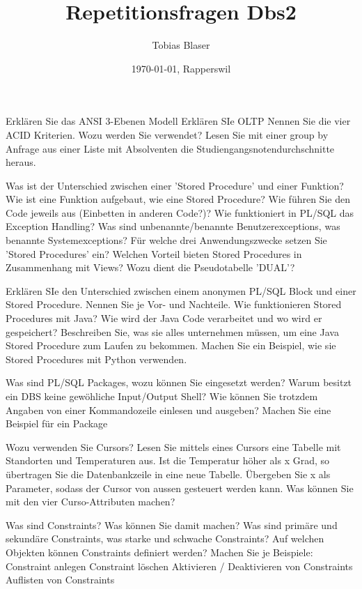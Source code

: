 \documentclass[ngerman,a4paper,12pt]{scrreprt}
\title{Repetitionsfragen Dbs2}
\author{Tobias Blaser}
\date{\today{}, Rapperswil}
\begin{document}
\tableofcontents
\clearpage


\ol
	\li Erklären Sie das ANSI 3-Ebenen Modell
	\li Erklären SIe OLTP
	\li Nennen Sie die vier ACID Kriterien. Wozu werden Sie verwendet?
	\li Lesen Sie mit einer group by Anfrage aus einer Liste mit Absolventen die Studiengangsnotendurchschnitte heraus.
\olS


\olR
	\li Was ist der Unterschied zwischen einer 'Stored Procedure' und einer Funktion?
	\li Wie ist eine Funktion aufgebaut, wie eine Stored Procedure? Wie führen Sie den Code jeweils aus (Einbetten in anderen Code?)?
	\li Wie funktioniert in PL/SQL das Exception Handling? Was sind unbenannte/benannte Benutzerexceptions, was benannte Systemexceptions?
	\li Für welche drei Anwendungszwecke setzen Sie 'Stored Procedures' ein?
	\li Welchen Vorteil bieten Stored Procedures in Zusammenhang mit Views?
	\li Wozu dient die Pseudotabelle 'DUAL'?
\olS


\olR
	\li Erklären SIe den Unterschied zwischen einem anonymen PL/SQL Block und einer Stored Procedure. Nennen Sie je Vor- und Nachteile.
	\li Wie funktionieren Stored Procedures mit Java?
	\li Wie wird der Java Code verarbeitet und wo wird er gespeichert?
	\li Beschreiben Sie, was sie alles unternehmen müssen, um eine Java Stored Procedure zum Laufen zu bekommen.
	\li Machen Sie ein Beispiel, wie sie Stored Procedures mit Python verwenden.
\olS


\olR
	\li Was sind PL/SQL Packages, wozu können Sie eingesetzt werden?
	\li Warum besitzt ein DBS keine gewöhliche Input/Output Shell? Wie können Sie trotzdem Angaben von einer Kommandozeile einlesen und ausgeben?
	\li Machen Sie eine Beispiel für ein Package
\olS


\olR
	\li Wozu verwenden Sie Cursors?
	\li Lesen Sie mittels eines Cursors eine Tabelle mit Standorten und Temperaturen aus. Ist die Temperatur höher als x Grad, so übertragen Sie die Datenbankzeile in eine neue Tabelle.
	Übergeben Sie x als Parameter, sodass der Cursor von aussen gesteuert werden kann.
	\li Was können Sie mit den vier Curso-Attributen machen?
\olS


\olR
	\li Was sind Constraints? Was können Sie damit machen?
	\li Was sind primäre und sekundäre Constraints, was starke und schwache Constraints?
	\li Auf welchen Objekten können Constraints definiert werden?
	\li Machen Sie je Beispiele:
		\ul
			\li Constraint anlegen
			\li Constraint löschen
			\li Aktivieren / Deaktivieren von Constraints
			\li Auflisten von Constraints
		\ulE
\olS
\end{document}
